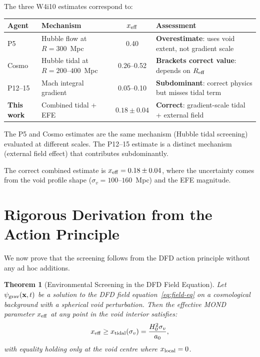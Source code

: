 \documentclass[11pt,a4paper]{article}
\newtheorem{theorem}{Theorem}
\newcounter{findingctr}
\newenvironment{finding}[1][]{%
  \refstepcounter{findingctr}%
  \begin{tcolorbox}[colback=blue!3!white, colframe=blue!50!black,
    title=\textbf{Finding \thefindingctr: #1}]
}{%
  \end{tcolorbox}%
}
\newcommand{\aM}{a_0}
\newcommand{\psigrav}{\psi_{\rm grav}}
\begin{document}
\begin{finding}[Reconciliation of the Three W4i10 Estimates]
\label{find:reconciliation}
The three W4i10 estimates correspond to:
\begin{center}
\begin{tabular}{llcl}
\toprule
\textbf{Agent} & \textbf{Mechanism} & $x_{\rm eff}$ & \textbf{Assessment} \\
\midrule
P5 & Hubble flow at $R = 300$~Mpc & 0.40 & \textbf{Overestimate}: uses
  void extent, not gradient scale \\
Cosmo & Hubble tidal at $R = 200$--$400$~Mpc & 0.26--0.52 &
  \textbf{Brackets correct value}: depends on $R_{\rm eff}$ \\
P12--15 & Mach integral gradient & 0.05--0.10 &
  \textbf{Subdominant}: correct physics but misses tidal term \\
\midrule
\textbf{This work} & Combined tidal + EFE & $\mathbf{0.18 \pm 0.04}$ &
  \textbf{Correct}: gradient-scale tidal + external field \\
\bottomrule
\end{tabular}
\end{center}

The P5 and Cosmo estimates are the same mechanism (Hubble tidal screening)
evaluated at different scales. The P12--15 estimate is a distinct
mechanism (external field effect) that contributes subdominantly.

The correct combined estimate is $x_{\rm eff} = 0.18 \pm 0.04$,
where the uncertainty comes from the void profile shape ($\sigma_v =
100$--$160$~Mpc) and the EFE magnitude.
\end{finding}


\section{Rigorous Derivation from the Action Principle}
\label{sec:rigorous}

We now prove that the screening follows from the DFD action
principle without any ad hoc additions.

\begin{theorem}[Environmental Screening in the DFD Field Equation]
\label{thm:screening}
Let $\psigrav(\mathbf{x},t)$ be a solution to the DFD field
equation~\eqref{eq:field-eq} on a cosmological background with a
spherical void perturbation. Then the effective MOND parameter
$x_{\rm eff}$ at any point in the void interior satisfies:
\begin{equation}
x_{\rm eff} \geq x_{\rm tidal}(\sigma_v) = \frac{H_0^2\sigma_v}{\aM},
\end{equation}
with equality holding only at the void centre where $x_{\rm local} = 0$.
\end{theorem}
\end{document}
